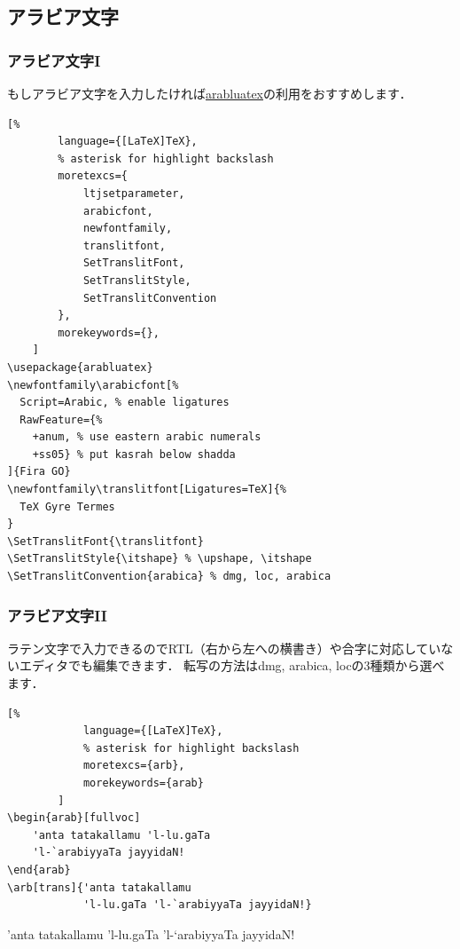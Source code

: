 \documentclass[%
    hyperref={%
        colorlinks,
        linkcolor=sDarkBlue,
        urlcolor=sDarkBlue,
        citecolor=sDarkBlue
    },
    aspectratio=169
]{beamer}
\newcommand{\inlinecommand}[1]{{\ttfamily #1}}
\begin{document}
    \subsection{アラビア文字}
    \begin{frame}[fragile]
    \frametitle{アラビア文字I}
        もしアラビア文字を入力したければ\href{https://ctan.org/pkg/arabluatex?lang=en}{arabluatex}の利用をおすすめします．
    \begin{leftbar}
    \begin{lstlisting}[%
        language={[LaTeX]TeX},
        % asterisk for highlight backslash
        moretexcs={
            ltjsetparameter,
            arabicfont,
            newfontfamily,
            translitfont,
            SetTranslitFont,
            SetTranslitStyle,
            SetTranslitConvention
        },
        morekeywords={},
    ]
\usepackage{arabluatex}
\newfontfamily\arabicfont[%
  Script=Arabic, % enable ligatures
  RawFeature={%
    +anum, % use eastern arabic numerals
    +ss05} % put kasrah below shadda
]{Fira GO}
\newfontfamily\translitfont[Ligatures=TeX]{%
  TeX Gyre Termes
}
\SetTranslitFont{\translitfont}
\SetTranslitStyle{\itshape} % \upshape, \itshape
\SetTranslitConvention{arabica} % dmg, loc, arabica
    \end{lstlisting}
    \end{leftbar}
    \end{frame}

    \begin{frame}[fragile]
        \frametitle{アラビア文字II}
        ラテン文字で入力できるのでRTL（右から左への横書き）や合字に対応していないエディタでも編集できます．
        転写の方法は\inlinecommand{dmg}, \inlinecommand{arabica}, \inlinecommand{loc}の3種類から選べます．

        \begin{leftbar}
        \begin{lstlisting}[%
            language={[LaTeX]TeX},
            % asterisk for highlight backslash
            moretexcs={arb},
            morekeywords={arab}
        ]
\begin{arab}[fullvoc]
    'anta tatakallamu 'l-lu.gaTa
    'l-`arabiyyaTa jayyidaN!
\end{arab}
\arb[trans]{'anta tatakallamu
            'l-lu.gaTa 'l-`arabiyyaTa jayyidaN!}
        \end{lstlisting}
        \end{leftbar}

        \begin{arab}[fullvoc]
            'anta tatakallamu 'l-lu.gaTa 'l-`arabiyyaTa jayyidaN!
        \end{arab}

        \bigskip

    \end{frame}
\end{document}

